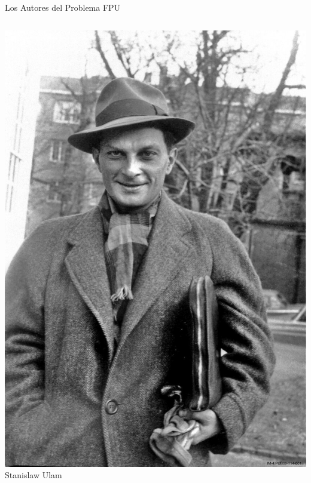 \begin{frame}{Los Autores del Problema FPU}
\begin{columns}[T]
        \begin{column}{0.24\textwidth}
            \centering
            \includegraphics[width=\textwidth]{images/ulam.jpg}
            Stanislaw Ulam
        \end{column}
        

\end{columns}
\end{frame}
